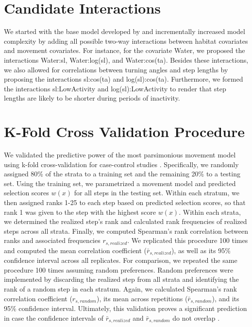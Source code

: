 \documentclass[../FinalThesis.tex]{subfiles}
\begin{document}
\newpage
\section{Candidate Interactions}
\label{CandidateInteractions}

We started with the base model developed by \citet{Hofmann.2021} and
incrementally increased model complexity by adding all possible two-way
interactions between habitat covariates and movement covariates. For instance,
for the covariate \textsf{Water}, we proposed the interactions
\textsf{Water:sl}, \textsf{Water:log(sl)}, and \textsf{Water:cos(ta)}. Besides
these interactions, we also allowed for correlations between turning angles and
step lengths by proposing the interactions \textsf{sl:cos(ta)} and
\textsf{log(sl):cos(ta)}. Furthermore, we formed the interactions
\textsf{sl:LowActivity} and \textsf{log(sl):LowActivity} to render that step
lengths are likely to be shorter during periods of inactivity.

\newpage
\section{K-Fold Cross Validation Procedure}
\label{CrossValidation}

We validated the predictive power of the most parsimonious movement model using
k-fold cross-validation for case-control studies \citep{Fortin.2009}.
Specifically, we randomly assigned 80\% of the strata to a training set and the
remaining 20\% to a testing set. Using the training set, we parametrized a
movement model and predicted selection scores \(w(x)\) for all steps in the
testing set. Within each stratum, we then assigned ranks 1-25 to each step based
on predicted selection scores, so that rank 1 was given to the step with the
highest score \(w(x)\). Within each strata, we determined the realized step's
rank and calculated rank frequencies of realized steps across all strata.
Finally, we computed Spearman's rank correlation between ranks and associated
frequencies \(r_{s, realized}\). We replicated this procedure 100 times and
computed the mean correlation coefficient (\(\bar{r}_{s, realized}\)), as well
as its 95\% confidence interval across all replicates. For comparison, we
repeated the same procedure 100 times assuming random preferences. Random
preferences were implemented by discarding the realized step from all strata and
identifying the rank of a random step in each stratum. Again, we calculated
Spearman's rank correlation coefficient (\(r_{s, random}\)), its mean across
repetitions (\(\bar{r}_{s, random}\)), and its 95\% confidence interval.
Ultimately, this validation proves a significant prediction in case the
confidence intervals of \(\bar{r}_{s, realized}\) and \(\bar{r}_{s, random}\) do
not overlap \citep{Fortin.2009}.
\end{document}
